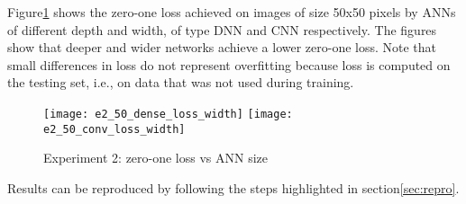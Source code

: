 Figure\ref{fig:e2_50_loss_width} shows the zero-one loss achieved on images of size 50x50 pixels by ANNs of different depth and width, of type DNN and CNN respectively. The figures show that deeper and wider networks achieve a lower zero-one loss. Note that small differences in loss do not represent overfitting because loss is computed on the testing set, i.e., on data that was not used during training.
\begin{figure}
\texttt{[image: e2\_50\_dense\_loss\_width]}
\texttt{[image: e2\_50\_conv\_loss\_width]}
\caption{Experiment 2: zero-one loss vs ANN size}\label{fig:e2_50_loss_width}
\end{figure}

Results can be reproduced by following the steps highlighted in section\ref{sec:repro}.
